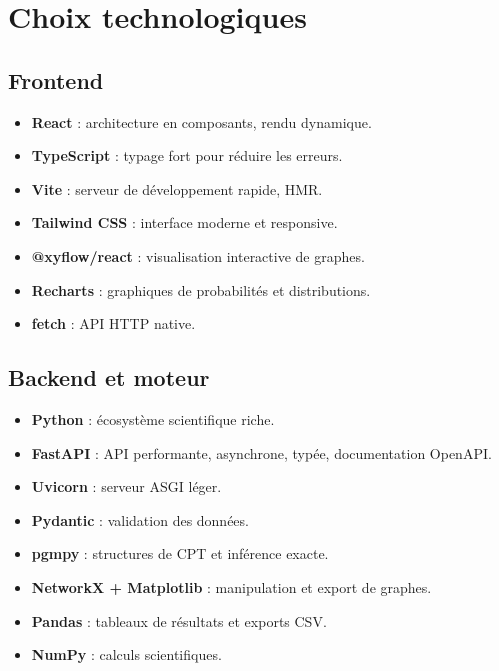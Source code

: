 \documentclass[12pt,a4paper]{article}
\newcommand{\forcereset}[1]{}
\begin{document}
\section{Choix technologiques}
\forcereset{6}

\subsection{Frontend}
\forcereset{4}

\begin{itemize}[leftmargin=1.2cm, itemsep=0.2\baselineskip]
    \item \textbf{React} : architecture en composants, rendu dynamique.
    \item \textbf{TypeScript} : typage fort pour réduire les erreurs.
    \item \textbf{Vite} : serveur de développement rapide, HMR.
    \item \textbf{Tailwind CSS} : interface moderne et responsive.
    \item \textbf{@xyflow/react} : visualisation interactive de graphes.
    \item \textbf{Recharts} : graphiques de probabilités et distributions.
    \item \textbf{fetch} : API HTTP native.
\end{itemize}

\subsection{Backend et moteur}
\forcereset{4}

\begin{itemize}[leftmargin=1.2cm, itemsep=0.2\baselineskip]
    \item \textbf{Python} : écosystème scientifique riche.
    \item \textbf{FastAPI} : API performante, asynchrone, typée, documentation OpenAPI.
    \item \textbf{Uvicorn} : serveur ASGI léger.
    \item \textbf{Pydantic} : validation des données.
    \item \textbf{pgmpy} : structures de CPT et inférence exacte.
    \item \textbf{NetworkX + Matplotlib} : manipulation et export de graphes.
    \item \textbf{Pandas} : tableaux de résultats et exports CSV.
    \item \textbf{NumPy} : calculs scientifiques.
\end{itemize}
\end{document}
